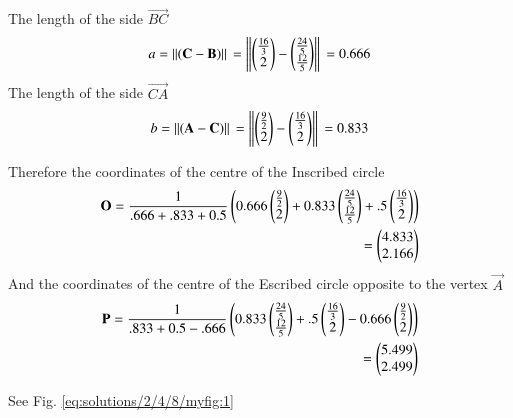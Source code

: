  The length of the side $\vec{BC}$
 \begin{equation}
  {a}=\left\lVert(\mathbf{C}-\mathbf{B})\right\rVert\\
    =\left\lVert\begin{pmatrix}\frac{16}{3}\\2\end{pmatrix}-\begin{pmatrix}\frac{24}{5}\\\frac{12}{5}\end{pmatrix}\right\rVert\\
    =0.666
\end{equation}
  The length of the side $\vec{CA}$ 
  \begin{equation}
  {b}=\left\lVert(\mathbf{A}-\mathbf{C})\right\rVert\\
    =\left\lVert\begin{pmatrix}\frac{9}{2}\\2\end{pmatrix}-\begin{pmatrix}\frac{16}{3}\\2\end{pmatrix}\right\rVert\\
    =0.833
\end{equation}
 
Therefore the coordinates of the centre of the Inscribed circle
 \begin{align}
 \mathbf{O}=\frac{1}{.666+.833+0.5}\begin{pmatrix}0.666\begin{pmatrix}\frac{9}{2}\\2\end{pmatrix}+ 0.833\begin{pmatrix}\frac{24}{5}\\\frac{12}{5}\end{pmatrix}+.5\begin{pmatrix}\frac{16}{3}\\2\end{pmatrix}\end{pmatrix}\\
={\begin{pmatrix}4.833\\2.166\end{pmatrix}}
 \end{align} 
And the coordinates of the centre of the Escribed circle  opposite to the vertex $\vec{A}$
 \begin{align}
\mathbf{P}=\frac{1}{.833+0.5-.666}\begin{pmatrix}0.833\begin{pmatrix}\frac{24}{5}\\\frac{12}{5}\end{pmatrix}+.5\begin{pmatrix}\frac{16}{3}\\2\end{pmatrix}-0.666\begin{pmatrix}\frac{9}{2}\\2\end{pmatrix}\end{pmatrix}\\
={\begin{pmatrix}5.499\\2.499\end{pmatrix}}
 \end{align}

See Fig.     \ref{eq:solutions/2/4/8/myfig:1}

